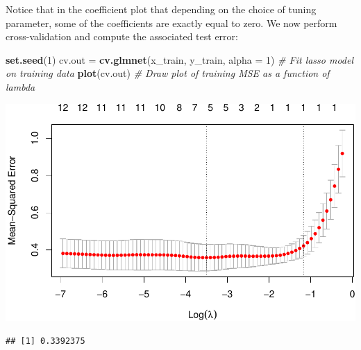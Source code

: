 \documentclass[]{article}
\newenvironment{Shaded}{\begin{snugshade}}{\end{snugshade}}
\newcommand{\KeywordTok}[1]{\textcolor[rgb]{0.13,0.29,0.53}{\textbf{#1}}}
\newcommand{\DataTypeTok}[1]{\textcolor[rgb]{0.13,0.29,0.53}{#1}}
\newcommand{\DecValTok}[1]{\textcolor[rgb]{0.00,0.00,0.81}{#1}}
\newcommand{\StringTok}[1]{\textcolor[rgb]{0.31,0.60,0.02}{#1}}
\newcommand{\CommentTok}[1]{\textcolor[rgb]{0.56,0.35,0.01}{\textit{#1}}}
\newcommand{\OperatorTok}[1]{\textcolor[rgb]{0.81,0.36,0.00}{\textbf{#1}}}
\newcommand{\NormalTok}[1]{#1}
\begin{document}
Notice that in the coefficient plot that depending on the choice of
tuning parameter, some of the coefficients are exactly equal to zero. We
now perform cross-validation and compute the associated test error:

\begin{Shaded}
\begin{Highlighting}[]
\KeywordTok{set.seed}\NormalTok{(}\DecValTok{1}\NormalTok{)}
\NormalTok{cv.out =}\StringTok{ }\KeywordTok{cv.glmnet}\NormalTok{(x_train, y_train, }\DataTypeTok{alpha =} \DecValTok{1}\NormalTok{) }\CommentTok{# Fit lasso model on training data}
\KeywordTok{plot}\NormalTok{(cv.out) }\CommentTok{# Draw plot of training MSE as a function of lambda}
\end{Highlighting}
\end{Shaded}

\includegraphics{BodyFat_files/figure-latex/unnamed-chunk-38-1.pdf}

\begin{Shaded}
\end{Shaded}

\begin{verbatim}
## [1] 0.3392375
\end{verbatim}
\end{document}
